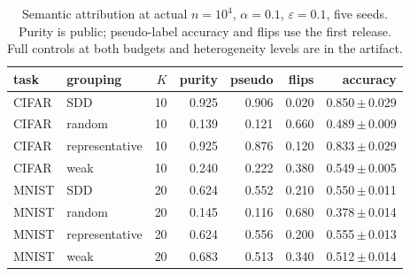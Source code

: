 \begin{table}[t]
\centering
\caption{Semantic attribution at actual $n=10^4$, $\alpha=0.1$, $\varepsilon=0.1$, five seeds. Purity is public; pseudo-label accuracy and flips use the first release. Full controls at both budgets and heterogeneity levels are in the artifact.}
\label{tab:new-controls}
\small\setlength{\tabcolsep}{3pt}
\begin{tabular}{@{}llrrrrr@{}}\toprule
task & grouping & $K$ & purity & pseudo & flips & accuracy \\\midrule
CIFAR & SDD & 10 & 0.925 & 0.906 & 0.020 & 0.850\,$\pm$\,0.029 \\
CIFAR & random & 10 & 0.139 & 0.121 & 0.660 & 0.489\,$\pm$\,0.009 \\
CIFAR & representative & 10 & 0.925 & 0.876 & 0.120 & 0.833\,$\pm$\,0.029 \\
CIFAR & weak & 10 & 0.240 & 0.222 & 0.380 & 0.549\,$\pm$\,0.005 \\
MNIST & SDD & 20 & 0.624 & 0.552 & 0.210 & 0.550\,$\pm$\,0.011 \\
MNIST & random & 20 & 0.145 & 0.116 & 0.680 & 0.378\,$\pm$\,0.014 \\
MNIST & representative & 20 & 0.624 & 0.556 & 0.200 & 0.555\,$\pm$\,0.013 \\
MNIST & weak & 20 & 0.683 & 0.513 & 0.340 & 0.512\,$\pm$\,0.014 \\
\bottomrule\end{tabular}
\end{table}

